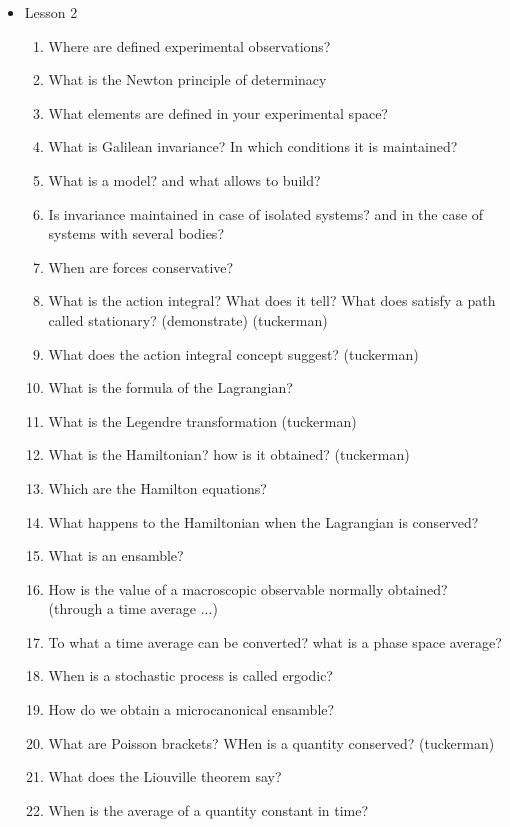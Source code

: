 {\begin{itemize}
\begin{enumerate}
    \end{enumerate}
    \item Lesson 2
    \begin{enumerate}
    \item Where are defined experimental observations?
        \item What is the Newton principle of determinacy
        \item What elements are defined in your experimental space?
        \item What is Galilean invariance? In which conditions it is maintained?
        \item What is a model? and what allows to build?
        \item Is invariance maintained in case of isolated systems? and in the case of systems with several bodies?
        \item When are forces conservative?
        \item What is the action integral? What does it tell? What does satisfy a path called stationary? (demonstrate) (tuckerman)
        \item What does the action integral concept suggest? (tuckerman)
        \item What is the formula of the Lagrangian?
        \item What is the Legendre transformation (tuckerman)
        \item What is the Hamiltonian? how is it obtained? (tuckerman)
        \item Which are the Hamilton equations?
        \item What happens to the Hamiltonian when the Lagrangian is conserved?
        \item What is an ensamble?
        \item How is the value of a macroscopic observable normally obtained? (through a time average ...)
        \item To what a time average can be converted? what is a phase space average?
        \item When is a stochastic process is called ergodic?
        \item How do we obtain a microcanonical ensamble?
        \item What are Poisson brackets? WHen is a quantity conserved? (tuckerman)
        \item What does the Liouville theorem say?
        \item When is the average of a quantity constant in time?

\end{enumerate}
\end{itemize}}
